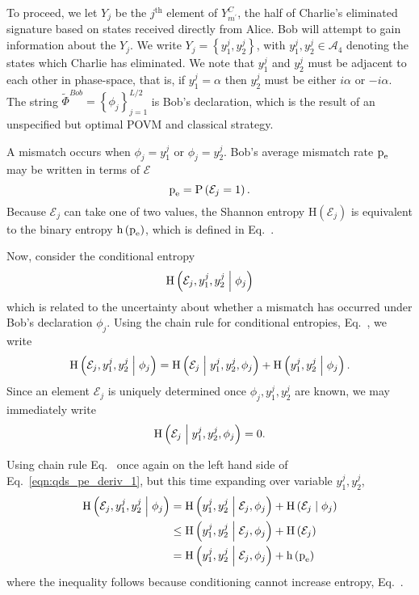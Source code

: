 To proceed, we let $Y_j$ be the $j^{\text{th}}$ element of $Y_{m^\prime}^C$, the half of Charlie's eliminated signature based on states received directly from Alice. Bob will attempt to gain information about the $Y_j$. We write $Y_j = \left\{y_1^j, y_2^j\right\}$, with $y_1^j, y_2^j \in \mathcal{A}_4$ denoting the states which Charlie has eliminated. We note that $y_1^j$ and $y_2^j$ must be adjacent to each other in phase-space, that is, if $y_1^j = \alpha$ then $y_2^j$ must be either $i \alpha$ or $- i \alpha$. The string $\tilde{\Phi}^{Bob} = \left\{\phi_j\right\}_{j=1}^{L/2}$ is Bob's declaration, which is the result of an unspecified but optimal POVM and classical strategy.

A mismatch occurs when $\phi_j = y_1^j$ or $\phi_j = y_2^j$. Bob's average mismatch rate $\text{p}_{\text{e}}$ may be written in terms of $\mathcal{E}$
\begin{equation}
\text{p}_{\text{e}} = \text{P}\left(\mathcal{E}_j = 1\right).
\end{equation}
Because $\mathcal{E}_j$ can take one of two values, the Shannon entropy $\text{H}\left(\mathcal{E}_j\right)$ is equivalent to the binary entropy $\text{h}\left(\text{p}_{\text{e}}\right)$, which is defined in Eq.~. %

Now, consider the conditional entropy
\begin{equation}
\text{H}\left(\mathcal{E}_j, y_1^j, y_2^j \; \middle| \; \phi_j\right)
\end{equation}
which is related to the uncertainty about whether a mismatch has occurred under Bob's declaration $\phi_j$. Using the chain rule for conditional entropies, Eq.~, we write
\begin{equation}\label{eqn:qds_pe_deriv_1}
\text{H}\left( \mathcal{E}_j, y_1^j, y_2^j \; \middle| \; \phi_j \right) = 
\text{H}\left( \mathcal{E}_j \; \middle| \; y_1^j, y_2^j, \phi_j\right) + 
\text{H}\left( y_1^j, y_2^j \; \middle| \; \phi_j\right).
\end{equation}
Since an element $\mathcal{E}_j$ is uniquely determined once $\phi_j, y_1^j, y_2^j$ are known, we may immediately write
\begin{equation}
\text{H}\left( \mathcal{E}_j \; \middle| \; y_1^j, y_2^j, \phi_j\right) = 0.
\end{equation}

\noindent Using chain rule Eq.~ once again on the left hand side of Eq.~\ref{eqn:qds_pe_deriv_1}, but this time expanding over variable $y_1^j, y_2^j$,
\begin{align}\label{eqn:qds_pe_deriv_2}
\text{H}\left( \mathcal{E}_j, y_1^j, y_2^j \; \middle| \; \phi_j \right) &=
\text{H}\left(y_1^j, y_2^j \; \middle| \; \mathcal{E}_j, \phi_j\right) + \text{H}\left(\mathcal{E}_j \; \middle| \; \phi_j\right) \notag \\
&\le \text{H}\left(y_1^j, y_2^j \; \middle| \; \mathcal{E}_j, \phi_j\right) + \text{H}\left(\mathcal{E}_j\right) \notag \\
&= \text{H}\left(y_1^j, y_2^j \; \middle| \; \mathcal{E}_j, \phi_j\right) + \text{h}\left(\text{p}_{\text{e}}\right)
\end{align}
where the inequality follows because conditioning cannot increase entropy, Eq.~.

